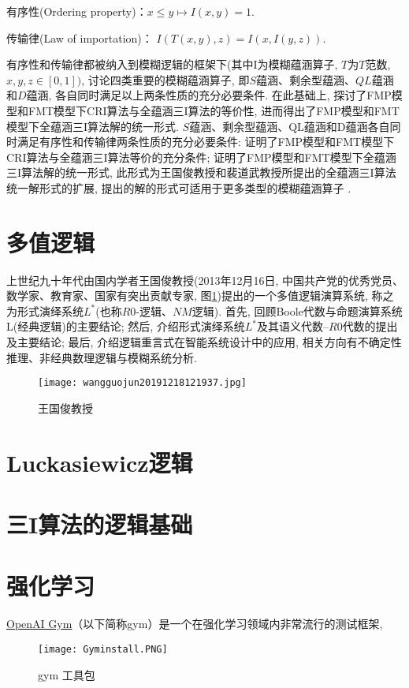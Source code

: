 有序性(Ordering property)：$ x\leq y\longmapsto I(x,y)=1$.

传输律(Law of importation)： $I(T(x,y),z)=I(x,I(y,z))$.

有序性和传输律都被纳入到模糊逻辑的框架下(其中I为模糊蕴涵算子, $T$为$T$范数, $x,y,z\in [0,1])$, 讨论四类重要的模糊蕴涵算子, 即$S$蕴涵、剩余型蕴涵、$QL$蕴涵和$D$蕴涵, 各自同时满足以上两条性质的充分必要条件. 在此基础上, 探讨了FMP模型和FMT模型下CRI算法与全蕴涵三I算法的等价性, 进而得出了FMP模型和FMT模型下全蕴涵三I算法解的统一形式.
$S$蕴涵、剩余型蕴涵、QL蕴涵和D蕴涵各自同时满足有序性和传输律两条性质的充分必要条件: 证明了FMP模型和FMT模型下CRI算法与全蕴涵三I算法等价的充分条件; 证明了FMP模型和FMT模型下全蕴涵三I算法解的统一形式, 此形式为王国俊教授和裴道武教授所提出的全蕴涵三I算法统一解形式的扩展, 提出的解的形式可适用于更多类型的模糊蕴涵算子 .
\section{多值逻辑}
上世纪九十年代由国内学者王国俊教授(2013年12月16日, 中国共产党的优秀党员、数学家、教育家、国家有突出贡献专家, 图\ref{wangguojun20191218121937})提出的一个多值逻辑演算系统, 称之为形式演绎系统$L^*$(也称$R0$-逻辑、$NM$逻辑). 首先, 回顾Boole代数与命题演算系统L(经典逻辑)的主要结论; 然后, 介绍形式演绎系统$L^*$及其语义代数--$R0$代数的提出及主要结论; 最后, 介绍逻辑重言式在智能系统设计中的应用, 相关方向有不确定性推理、非经典数理逻辑与模糊系统分析.
\begin{figure}[H]
\centering
\texttt{[image: wangguojun20191218121937.jpg]}
\caption{王国俊教授}
\label{wangguojun20191218121937}
\end{figure}
\section{Luckasiewicz逻辑}
\section{三I算法的逻辑基础}
\section{强化学习}
\href{https://gym.openai.com/}{OpenAI Gym}（以下简称gym）是一个在强化学习领域内非常流行的测试框架, 
\begin{figure}[H]
\centering
\texttt{[image: Gyminstall.PNG]}
\caption{gym 工具包}
\label{Gyminstall}
\end{figure}


